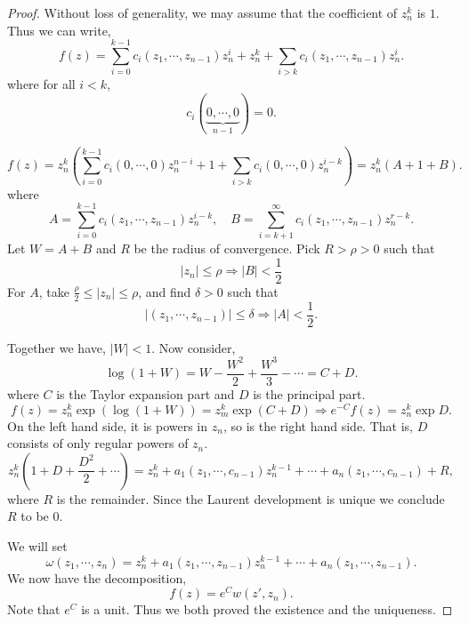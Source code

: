 \documentclass{article}
\begin{document}
\begin{proof}
  Without loss of generality, we may assume that the coefficient of $z_n^k$ is $1$. Thus we can write,
  \begin{equation*}
    f(z) = \sum_{i=0}^{k-1} c_i(z_1,\cdots,z_{n-1})z_n^i + z_n^k + \sum_{i>k}c_i(z_1,\cdots,z_{n-1})z_n^i.
  \end{equation*}
  where for all $i<k$,
  \begin{equation*}
    c_i(\underbrace{0,\cdots,0}_{n-1}) = 0.
  \end{equation*}

  \begin{equation*}
    f(z) = z_n^k\left(\sum_{i=0}^{k-1} c_i(0,\cdots,0)z_n^{n-i}+1+\sum_{i>k}c_i(0,\cdots,0)z_{n}^{i-k}\right) = z_n^k(A+1+B).
  \end{equation*}
  where 
  \begin{equation*}
    A = \sum_{i=0}^{k-1}c_i(z_1,\cdots,z_{n-1})z_n^{i-k},\quad B=\sum_{i=k+1}^\infty c_i(z_1,\cdots,z_{n-1})z_n^{r-k}.
  \end{equation*}
  Let $W=A+B$ and $R$ be the radius of convergence. Pick $R>\rho>0$ such that 
  \begin{equation*}
   \vert z_n\vert\leq\rho\Rightarrow \vert B\vert<{\frac 1 2}
  \end{equation*}
  For $A$, take ${\frac \rho 2}\leq \vert z_n\vert \leq \rho$, and find $\delta>0$ such that 
  \begin{equation*}
    \vert (z_1,\cdots,z_{n-1})\vert \leq \delta\Rightarrow \vert A\vert<{\frac 1 2}.
  \end{equation*}
  \par Together we have, $\vert W\vert <1$. Now consider,
  \begin{equation*}
    \log(1+W) = W - {\frac {W^2} 2} + {\frac {W^3} 3} - \cdots = C + D.
  \end{equation*}
  where $C$ is the Taylor expansion part and $D$ is the principal part. 
  \begin{equation*}
    f(z) = z_n^k\exp(\log(1+W)) = z_m^k\exp(C+D)\Rightarrow e^{-C}f(z) = z_n^k\exp D.
  \end{equation*}
  On the left hand side, it is powers in $z_n$, so is the right hand side. That is, $D$ consists of only regular powers of $z_n$. 
  \begin{equation*}
    z^k_n\left(1+D+{\frac {D^2} 2}+\cdots\right) = z^k_n + a_1(z_1,\cdots,c_{n-1})z_{n}^{k-1} +\cdots + a_n(z_1,\cdots,c_{n-1}) + R,
  \end{equation*}
  where $R$ is the remainder. Since the Laurent development is unique we conclude $R$ to be $0$.
  \par We will set 
  \begin{equation*}
    \omega(z_1,\cdots,z_n) = z^k_n + a_1(z_1,\cdots,z_{n-1})z_{n}^{k-1} + \cdots + a_n(z_1,\cdots,z_{n-1}).
  \end{equation*}
  We now have the decomposition,
  \begin{equation*}
    f(z) = e^{C}w(z',z_n).
  \end{equation*}
  Note that $e^{C}$ is a unit. Thus we both proved the existence and the uniqueness.
\end{proof}
\end{document}
